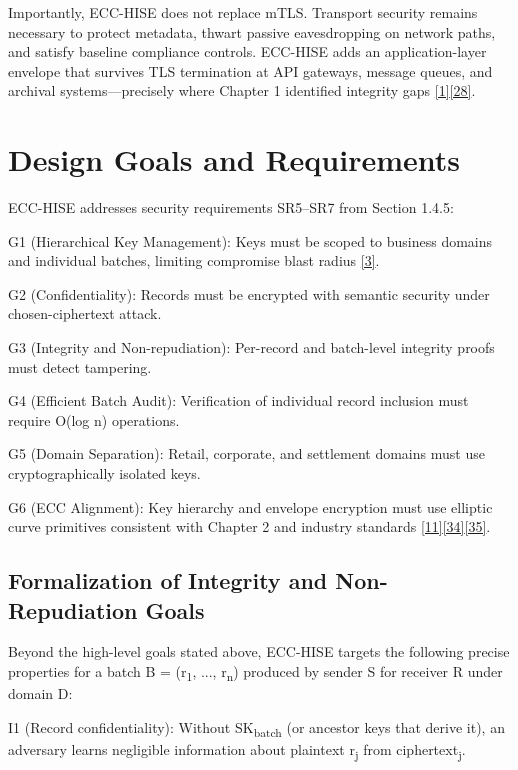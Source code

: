 \indent Importantly, ECC-HISE does not replace mTLS. Transport security remains necessary to protect metadata, thwart passive eavesdropping on network paths, and satisfy baseline compliance controls. ECC-HISE adds an application-layer envelope that survives TLS termination at API gateways, message queues, and archival systems---precisely where Chapter 1 identified integrity gaps \hyperref[ref:1]{[1]}\hyperref[ref:28]{[28]}.

\section{Design Goals and Requirements}

\indent ECC-HISE addresses security requirements SR5--SR7 from Section 1.4.5:

\indent G1 (Hierarchical Key Management): Keys must be scoped to business domains and individual batches, limiting compromise blast radius \hyperref[ref:3]{[3]}.

\indent G2 (Confidentiality): Records must be encrypted with semantic security under chosen-ciphertext attack.

\indent G3 (Integrity and Non-repudiation): Per-record and batch-level integrity proofs must detect tampering.

\indent G4 (Efficient Batch Audit): Verification of individual record inclusion must require O(log n) operations.

\indent G5 (Domain Separation): Retail, corporate, and settlement domains must use cryptographically isolated keys.

\indent G6 (ECC Alignment): Key hierarchy and envelope encryption must use elliptic curve primitives consistent with Chapter 2 and industry standards \hyperref[ref:11]{[11]}\hyperref[ref:34]{[34]}\hyperref[ref:35]{[35]}.

\subsection{Formalization of Integrity and Non-Repudiation Goals}

\indent Beyond the high-level goals stated above, ECC-HISE targets the following precise properties for a batch B = (r\textsubscript{1}, ..., r\textsubscript{n}) produced by sender S for receiver R under domain D:

\indent I1 (Record confidentiality): Without SK\textsubscript{batch} (or ancestor keys that derive it), an adversary learns negligible information about plaintext r\textsubscript{j} from ciphertext\textsubscript{j}.


